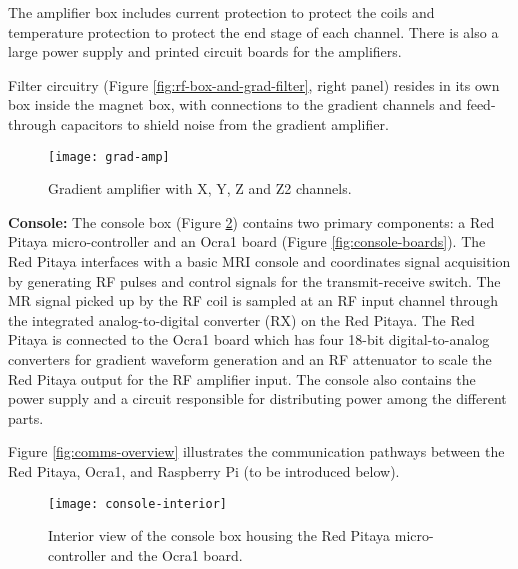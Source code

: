 The amplifier box includes current protection to protect the coils and temperature protection to protect the end stage of each channel. There is also a large power supply and printed circuit boards for the amplifiers.

Filter circuitry (Figure \ref{fig:rf-box-and-grad-filter}, right panel) resides in its own box inside the magnet box, with connections to the gradient channels and feed-through capacitors to shield noise from the gradient amplifier.

\begin{figure}[h]
    \centering
    \texttt{[image: grad-amp]}
    \captionsetup{width=.9\textwidth}
    \caption{\label{fig:grad-amp} Gradient amplifier with X, Y, Z and Z2 channels.}
    \vspace{-2mm}
\end{figure}

\vspace{5mm}

\noindent\textbf{Console:} The console box (Figure \ref{fig:console}) contains two primary components: a Red Pitaya micro-controller and an Ocra1 board (Figure \ref{fig:console-boards}). The Red Pitaya interfaces with a basic MRI console and coordinates signal acquisition by generating RF pulses and control signals for the transmit-receive switch. The MR signal picked up by the RF coil is sampled at an RF input channel through the integrated analog-to-digital converter (RX) on the Red Pitaya. The Red Pitaya is connected to the Ocra1 board which has four 18-bit digital-to-analog converters for gradient waveform generation and an RF attenuator to scale the Red Pitaya output for the RF amplifier input. The console also contains the power supply and a circuit responsible for distributing power among the different parts.

Figure \ref{fig:comms-overview} illustrates the communication pathways between the Red Pitaya, Ocra1, and Raspberry Pi (to be introduced below).

\begin{figure}[h]
    \centering
    \texttt{[image: console-interior]}
    \caption{\label{fig:console} Interior view of the console box housing the Red Pitaya micro-controller and the Ocra1 board.}
    \vspace{-5mm}
\end{figure}

